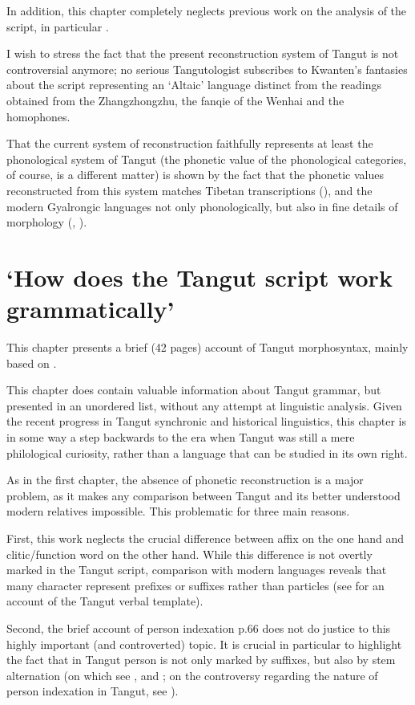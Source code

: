 \documentclass[oneside,a4paper,11pt]{article}
\begin{document}
In addition, this chapter completely neglects previous work on the analysis of the script, in particular \citet{gong84}. 

I wish to stress the fact that the present reconstruction system of Tangut is not controversial anymore; no serious Tangutologist subscribes to Kwanten's fantasies about the script representing an `Altaic' language distinct from the readings obtained from the Zhangzhongzhu, the fanqie of the Wenhai and the homophones.

That the current system of reconstruction faithfully represents at least the phonological system of Tangut (the phonetic value of the phonological categories, of course, is a different matter) is shown by the fact that the phonetic values reconstructed from this system matches Tibetan transcriptions (\citealt{nie86qianjiazi, tai08duiyin}), and the modern Gyalrongic languages not only phonologically, but also in fine details of morphology (\citealt{jacques14esquisse}, \citealt{gong16stems}).


\section{`How does the Tangut script work grammatically'}
This chapter presents a brief (42 pages) account of Tangut morphosyntax, mainly based on \citet{kepping85}. 

This chapter does contain valuable information about Tangut grammar, but presented in an unordered list, without any attempt at linguistic analysis. Given the recent progress in Tangut synchronic and historical linguistics, this chapter is in some way a step backwards to the era when Tangut was still a mere philological curiosity, rather than a language that can be studied in its own right.

As in the first chapter, the absence of phonetic reconstruction is a major problem, as it makes any comparison between Tangut and its better understood modern relatives impossible. This problematic for three main reasons.

First, this work neglects the crucial difference between affix on the one hand and clitic/function word on the other hand. While this difference is not overtly marked in the Tangut script, comparison with modern languages reveals that many character represent prefixes or suffixes rather than particles (see \citealt{jacques11tangut.verb} for an account of the Tangut verbal template).

Second, the brief account of person indexation p.66 does not do justice to this highly important (and controverted) topic. It is crucial in particular to highlight the fact that in Tangut person is not only marked by suffixes, but also by stem alternation (on which see \citealt{gong01huying}, \citealt{jacques09tangutverb} and \citealt{gong16stems}; on the controversy regarding the nature of person indexation in Tangut, see \citealt{jacques16th}).
 
\end{document}
